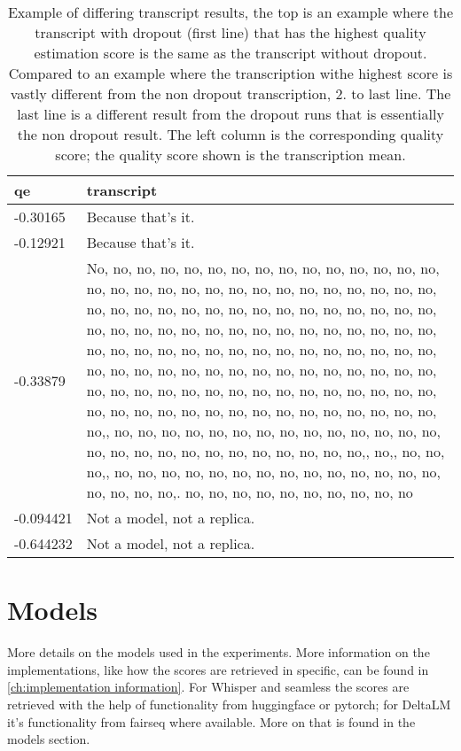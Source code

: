 \begin{table}[ht]
    \centering
    \begin{tabularx}{\textwidth}{l|X}
         qe& transcript \\\hline
         -0.30165& Because that's it. \\
         -0.12921& Because that's it.\\\hline
         -0.33879& No, no, no, no, no, no, no, no, no, no, no, no, no, no, no, no, no, no, no, no, no, no, no, no, no, no, no, no, no, no, no, no, no, no, no, no, no, no, no, no, no, no, no, no, no, no, no, no, no, no, no, no, no, no, no, no, no, no, no, no, no, no, no, no, no, no, no, no, no, no, no, no, no, no, no, no, no, no, no, no, no, no, no, no, no, no, no, no, no, no, no, no, no, no, no, no, no, no, no, no, no, no, no, no, no, no, no, no, no, no, no, no, no, no, no, no, no, no, no, no, no,, no, no, no, no, no, no, no, no, no, no, no, no, no, no, no, no, no, no, no, no, no, no, no, no, no, no,, no,, no, no, no,, no, no, no, no, no, no, no, no, no, no, no, no, no, no, no, no, no, no,. no, no, no, no, no, no, no, no, no, no\\
         -0.094421 &Not a model, not a replica.\\
         -0.644232&  Not a model, not a replica.
    \end{tabularx}
    \caption{Example of differing transcript results, the top is an example where the transcript with dropout (first line) that has the highest quality estimation score is the same as the transcript without dropout. Compared to an example where the transcription withe highest score is vastly different from the non dropout transcription, 2. to last line. The last line is a different result from the dropout runs that is essentially the non dropout result. The left column is the corresponding quality score; the quality score shown is the transcription mean.}
    \label{tab:transcriptshift}
\end{table}



\section{Models}
More details on the models used in the experiments. More information on the implementations, like how the scores are retrieved in specific, can be found in \autoref{ch:implementation information}. For Whisper and seamless the scores are retrieved with the help of functionality from huggingface or pytorch; for DeltaLM it's functionality from fairseq where available. More on that is found in the models section.

